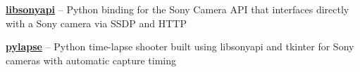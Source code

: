 \textbf{\href{https://github.com/petabite/libsonyapi}{libsonyapi}} -- Python binding for the Sony Camera API that interfaces directly with a Sony camera via SSDP and HTTP

\smdivider

\textbf{\href{https://github.com/petabite/pylapse}{pylapse}} -- Python time-lapse shooter built using libsonyapi and tkinter for Sony cameras with automatic capture timing





















